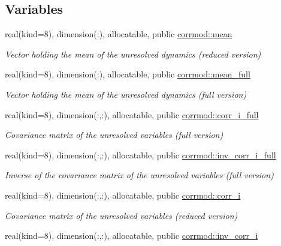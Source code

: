 \subsection*{Variables}
\begin{DoxyCompactItemize}
\item 
real(kind=8), dimension(\+:), allocatable, public \hyperlink{namespacecorrmod_a1f1f0cbe5283ace955c2d27c4b34f2c0}{corrmod\+::mean}
\begin{DoxyCompactList}\small\item\em Vector holding the mean of the unresolved dynamics (reduced version) \end{DoxyCompactList}\item 
real(kind=8), dimension(\+:), allocatable, public \hyperlink{namespacecorrmod_a9c59d06165027aa6b1751e219726564a}{corrmod\+::mean\+\_\+full}
\begin{DoxyCompactList}\small\item\em Vector holding the mean of the unresolved dynamics (full version) \end{DoxyCompactList}\item 
real(kind=8), dimension(\+:,\+:), allocatable, public \hyperlink{namespacecorrmod_a978b78f1d6906afe06e63768535b44f7}{corrmod\+::corr\+\_\+i\+\_\+full}
\begin{DoxyCompactList}\small\item\em Covariance matrix of the unresolved variables (full version) \end{DoxyCompactList}\item 
real(kind=8), dimension(\+:,\+:), allocatable, public \hyperlink{namespacecorrmod_af2ab9712d246a94ae1a801a011aee3d8}{corrmod\+::inv\+\_\+corr\+\_\+i\+\_\+full}
\begin{DoxyCompactList}\small\item\em Inverse of the covariance matrix of the unresolved variables (full version) \end{DoxyCompactList}\item 
real(kind=8), dimension(\+:,\+:), allocatable, public \hyperlink{namespacecorrmod_a859a67113b5271db0df70e60cbf0687b}{corrmod\+::corr\+\_\+i}
\begin{DoxyCompactList}\small\item\em Covariance matrix of the unresolved variables (reduced version) \end{DoxyCompactList}\item 
real(kind=8), dimension(\+:,\+:), allocatable, public \hyperlink{namespacecorrmod_a5a938587078064124588605255e93a19}{corrmod\+::inv\+\_\+corr\+\_\+i}

\end{DoxyCompactItemize}
